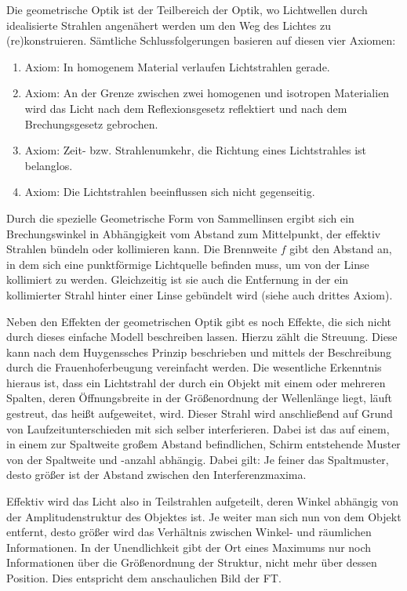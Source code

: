 
Die geometrische Optik ist der Teilbereich der Optik, wo Lichtwellen durch idealisierte Strahlen angenähert werden um den Weg des Lichtes zu (re)konstruieren. Sämtliche Schlussfolgerungen basieren auf diesen vier Axiomen:

\begin{enumerate}
	\item{Axiom:} In homogenem Material verlaufen Lichtstrahlen gerade.
	\item{Axiom:} An der Grenze zwischen zwei homogenen und isotropen Materialien wird das Licht nach dem Reflexionsgesetz reflektiert und nach dem Brechungsgesetz gebrochen.
	\item{Axiom:} Zeit- bzw. Strahlenumkehr, die Richtung eines Lichtstrahles ist belanglos.
	\item{Axiom:} Die Lichtstrahlen beeinflussen sich nicht gegenseitig.
\end{enumerate}

Durch die spezielle Geometrische Form von Sammellinsen ergibt sich ein Brechungswinkel in Abhängigkeit vom Abstand zum Mittelpunkt, der effektiv Strahlen bündeln oder kollimieren kann. Die Brennweite $f$ gibt den Abstand an, in dem sich eine punktförmige Lichtquelle befinden muss, um von der Linse kollimiert zu werden. Gleichzeitig ist sie auch die Entfernung in der ein kollimierter Strahl hinter einer Linse gebündelt wird (siehe auch drittes Axiom).

Neben den Effekten der geometrischen Optik gibt es noch Effekte, die sich nicht durch dieses einfache Modell beschreiben lassen. Hierzu zählt die Streuung. Diese kann nach dem Huygenssches Prinzip\cite{_huygenssches_????} beschrieben und mittels der Beschreibung durch die Frauenhoferbeugung\cite{_beugungsintegral_2015}\cite[Kap. 2]{stossel_fourieroptik:_1993} vereinfacht werden. Die wesentliche Erkenntnis hieraus ist, dass ein Lichtstrahl der durch ein Objekt mit einem oder mehreren Spalten, deren Öffnungsbreite in der Größenordnung der Wellenlänge liegt, läuft gestreut, das heißt aufgeweitet, wird. Dieser Strahl wird anschließend auf Grund von Laufzeitunterschieden mit sich selber interferieren. Dabei ist das auf einem, in einem zur Spaltweite großem Abstand befindlichen, Schirm entstehende Muster von der Spaltweite und -anzahl abhängig. Dabei gilt: Je feiner das Spaltmuster, desto größer ist der Abstand zwischen den Interferenzmaxima.

Effektiv wird das Licht also in Teilstrahlen aufgeteilt, deren Winkel abhängig von der Amplitudenstruktur des Objektes ist. Je weiter man sich nun von dem Objekt entfernt, desto größer wird das Verhältnis zwischen Winkel- und räumlichen Informationen. In der Unendlichkeit gibt der Ort eines Maximums nur noch Informationen über die Größenordnung der Struktur, nicht mehr über dessen Position. Dies entspricht dem anschaulichen Bild der FT.

